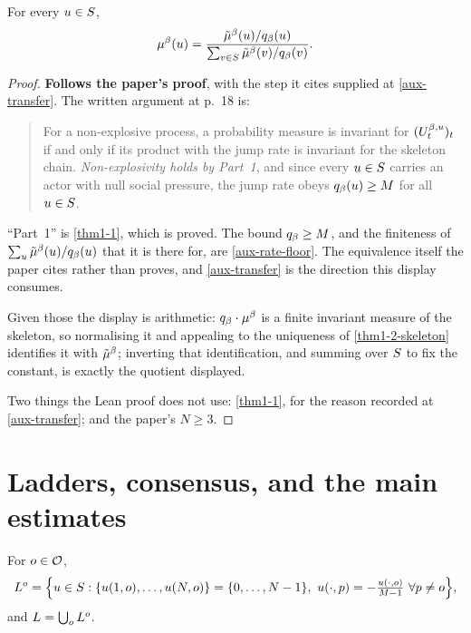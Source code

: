 \begin{lemma}
  \label{eq13}
  \leanok
  For every $u \in S$,
  \[
    \mu^\beta(u) = \frac{\tilde{\mu}^\beta(u)/q_\beta(u)}
                     {\sum_{v \in S} \tilde{\mu}^\beta(v)/q_\beta(v)} .
  \]
\end{lemma}
\begin{proof}
  \leanok
  \textbf{Follows the paper's proof}, with the step it cites supplied at
  \ref{aux-transfer}.  The written argument at p.~18 is:

  \begin{quote}
    For a non-explosive process, a probability measure is invariant for
    $(U^{\beta,u}_t)_t$ if and only if its product with the jump rate is
    invariant for the skeleton chain.  \emph{Non-explosivity holds by Part~1},
    and since every $u \in S$ carries an actor with null social pressure,
    the jump rate obeys $q_\beta(u) \ge M$ for all $u \in S$.
  \end{quote}

  ``Part~1'' is \ref{thm1-1}, which is proved.  The bound $q_\beta \ge M$, and
  the finiteness of $\sum_u \tilde{\mu}^\beta(u)/q_\beta(u)$ that it is there for, are
  \ref{aux-rate-floor}.  The equivalence itself the paper cites rather than
  proves, and \ref{aux-transfer} is the direction this display consumes.

  Given those the display is arithmetic: $q_\beta \cdot \mu^\beta$ is a finite
  invariant measure of the skeleton, so normalising it and appealing to the
  uniqueness of \ref{thm1-2-skeleton} identifies it with $\tilde{\mu}^\beta$; inverting
  that identification, and summing over $S$ to fix the constant, is
  exactly the quotient displayed.

  Two things the Lean proof does not use: \ref{thm1-1}, for the reason recorded
  at \ref{aux-transfer}; and the paper's $N \ge 3$.
\end{proof}

\section{Ladders, consensus, and the main estimates}

\begin{definition}
  \label{def1}
  \leanok
  For $o \in \mathcal{O}$,
  \[
    L^o = \Bigl\{ u \in S :
      \{u(1,o), \dots, u(N,o)\} = \{0, \dots, N-1\},\
      u(\cdot,p) = -\tfrac{u(\cdot,o)}{M-1} \ \forall p \ne o \Bigr\},
  \]
  and $L = \bigcup_{o} L^o$.
\end{definition}

